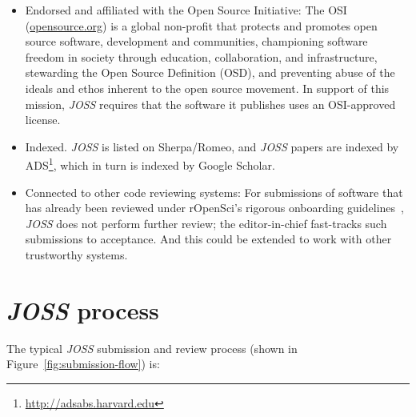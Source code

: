\documentclass{article}
\newcommand\joss{\textit{JOSS}}
\begin{document}
\begin{itemize}
\item Endorsed and affiliated with the Open Source Initiative: The OSI (\href{https://opensource.org}{opensource.org}) is a global non-profit that protects and promotes open source software, development and communities, championing software freedom in society through education, collaboration, and infrastructure, stewarding the Open Source Definition (OSD), and preventing abuse of the ideals and ethos inherent to the open source movement. In support of this mission, \joss{} requires that the  software it publishes uses an OSI-approved license.

\item Indexed. \joss{} is listed on Sherpa/Romeo, and \joss{} papers are indexed by ADS\footnote{\url{http://adsabs.harvard.edu}}, which in turn is indexed by Google Scholar.

\item Connected to other code reviewing systems: For submissions of software that has already been reviewed under rOpenSci's rigorous
onboarding guidelines~\cite{Ram:2016ws}, \joss{} does not perform 
further review; the editor-in-chief fast-tracks such submissions to acceptance. And this could be extended to work with other trustworthy systems.

\end{itemize}


\section{\joss{} process}\label{sec:process}

The typical \joss{} submission and review process (shown in Figure~\ref{fig:submission-flow}) is: 
\end{document}
